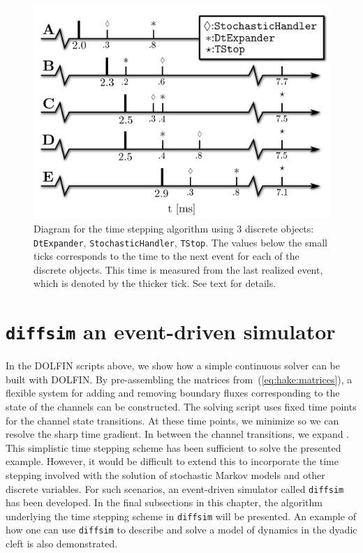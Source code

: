\begin{figure}
  \label{fig:hake:time-line}
  \centering
  \includegraphics[width=0.6\linewidth]{chapters/hake/pdf/timeline}
  \caption[Time stepping algorithm]{Diagram for the time stepping
    algorithm using 3 discrete objects: \texttt{DtExpander},
    \texttt{StochasticHandler}, \texttt{TStop}. The values below the
    small ticks corresponds to the time to the next event for each of
    the discrete objects. This time is measured from the last realized
    event, which is denoted by the thicker tick. See text for details.}
\end{figure}

\section{\texttt{diffsim} an event-driven simulator}
\label{sec:hake:diffsim}
   In
the DOLFIN scripts above, we show how a simple continuous solver can
be built with DOLFIN. By pre-assembling the matrices
from~(\ref{eq:hake:matrices}), a flexible system for adding and
removing boundary fluxes corresponding to the state of the channels
can be constructed. The solving script uses fixed time points for the
channel state transitions. At these time points, we minimize \Dt so we
can resolve the sharp time gradient. In between the channel
transitions, we expand \Dt. This simplistic time stepping scheme has
been sufficient to solve the presented example. However, it would be
difficult to extend this to incorporate the time stepping involved
with the solution of stochastic Markov models and other discrete
variables. For such scenarios, an event-driven simulator called
\texttt{diffsim} has been developed. In the final subsections in this
chapter, the algorithm underlying the time stepping scheme in
\texttt{diffsim} will be presented. An example of how one can use
\texttt{diffsim} to describe and solve a model of \Ca dynamics in the
dyadic cleft is also demonstrated.

